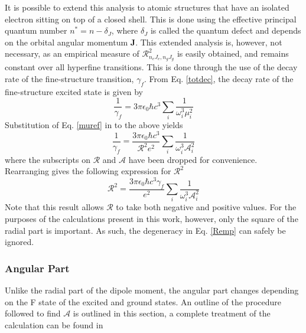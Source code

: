 It is possible to extend this analysis to atomic structures that have an isolated electron sitting on top of a closed shell. This is done using the effective principal quantum number $n^*= n - \delta_{J}$, where $\delta_{J}$ is called the quantum defect and depends on the orbital angular momentum \textbf{J}. This extended analysis is, however, not necessary, as an empirical measure of $ \mathcal{R}^2_{n_e J_e, n_g J_g}$ is easily obtained, and remains constant over all hyperfine transitions. This is done through the use of the decay rate of the fine-structure transition, $\gamma_f$. From Eq. \ref{totdec}, the decay rate of the fine-structure excited state is given by
\begin{equation}
\frac{1}{\gamma_f} = 3 \pi \epsilon_0 \hbar c^3 \sum_i \frac{1}{\omega_i^3 \mu_i^2}
\end{equation}
Substitution of Eq. \ref{muref} in to the above yields
\begin{equation}
\frac{1}{\gamma_f} = \frac{3 \pi \epsilon_0 \hbar c^3}{\mathcal{R}^2e^2} \sum_i \frac{1}{\omega_i^3\mathcal{A}^2_i}
\end{equation}
where the subscripts on $\mathcal{R}$ and $\mathcal{A}$ have been dropped for convenience. Rearranging gives the following expression for $\mathcal{R}^2$
\begin{equation}
\mathcal{R}^2 = \frac{3 \pi \epsilon_0 \hbar c^3 \gamma_f}{e^2} \sum_i \frac{1}{\omega_i^3\mathcal{A}^2_i}
\label{Remp}
\end{equation}
Note that this result allows $\mathcal{R}$ to take both negative and positive values. For the purposes of the calculations present in this work, however, only the square of the radial part is important. As such, the degeneracy in Eq. \ref{Remp} can safely be ignored. 
\subsubsection*{Angular Part}
Unlike the radial part of the dipole moment, the angular part changes depending on the F state of the excited and ground states. An outline of the procedure followed to find $\mathcal{A}$ is outlined in this section, a complete treatment of the calculation can be found in \cite{LasCool} 

